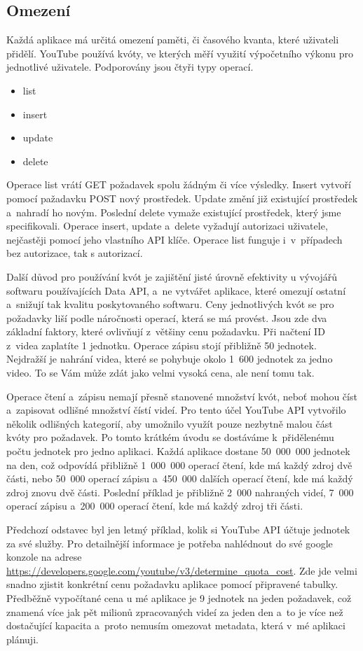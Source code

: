 \subsection{Omezení}
\par Každá aplikace má určitá omezení paměti, či časového kvanta, které uživateli přidělí. YouTube používá kvóty, ve kterých měří využití výpočetního výkonu pro jednotlivé uživatele. Podporovány jsou čtyři typy operací.
\begin{itemize}
\item {list}
\item {insert}
\item {update}
\item {delete}
\end{itemize}
Operace list vrátí GET požadavek spolu žádným či více výsledky. Insert vytvoří pomocí pažadavku POST nový prostředek. Update změní již existující prostředek a~nahradí ho novým. Poslední delete vymaže existující prostředek, který jsme specifikovali. Operace insert, update a~delete vyžadují autorizaci uživatele, nejčastěji pomocí jeho vlastního API klíče. Operace list funguje i~v~případech bez autorizace, tak s autorizací.
\par Další důvod pro používání kvót je zajištění jisté úrovně efektivity u vývojářů softwaru používajících Data API, a~ne vytvářet aplikace, které omezují ostatní a~snižují tak kvalitu poskytovaného softwaru. Ceny jednotlivých kvót se pro požadavky liší podle náročnosti operací, která se má provést. Jsou zde dva základní faktory, které ovlivňují z~většiny cenu požadavku. Při načtení ID z~videa zaplatíte 1 jednotku. Operace zápisu stojí přibližně 50 jednotek. Nejdražší je nahrání videa, které se pohybuje okolo 1~600 jednotek za jedno video. To se Vám může zdát jako velmi vysoká cena, ale není tomu tak. 
\par Operace čtení a~zápisu nemají přesně stanovené množství kvót, neboť mohou číst a~zapisovat odlišné množství čístí videí. Pro tento účel YouTube API vytvořilo několik odlišných kategorií, aby umožnilo využít pouze nezbytně malou část kvóty pro požadavek. Po tomto krátkém úvodu se dostáváme k~přidělenému počtu jednotek pro jedno aplikaci. Každá aplikace dostane 50~000~000 jednotek na den, což odpovídá přibližně 1~000~000 operací čtení, kde má každý zdroj dvě části, nebo 50~000 operací zápisu a~450~000 dalších operací čtení, kde má každý zdroj znovu dvě části. Poslední příklad je přibližně 2~000 nahraných videí, 7~000 operací zápisu a~200~000 operací čtení, kde má každý zdroj tři části.
\par Předchozí odstavec byl jen letmý příklad, kolik si YouTube API účtuje jednotek za své služby. Pro detailnější informace je potřeba nahlédnout do své google konzole na adrese \url{https://developers.google.com/youtube/v3/determine_quota_cost}. Zde jde velmi snadno zjistit konkrétní cenu požadavku aplikace pomocí připravené tabulky. Předběžně vypočítané cena u mé aplikace je 9 jednotek na jeden požadavek, což znamená více jak pět milionů zpracovaných videí za jeden den a~to je více než dostačující kapacita a~proto nemusím omezovat metadata, která v~mé aplikaci plánuji. 


%
